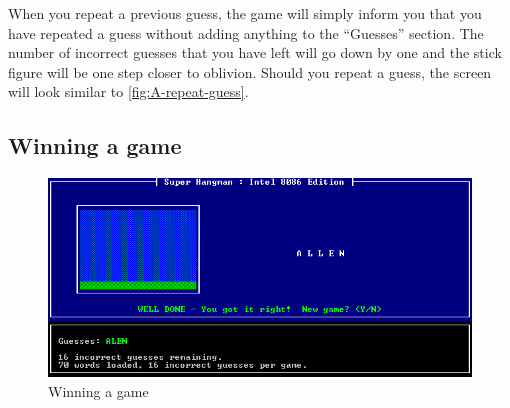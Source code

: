 When you repeat a previous guess, the game will simply inform you
that you have repeated a guess without adding anything to the ``Guesses''
section. The number of incorrect guesses that you have left will go
down by one and the stick figure will be one step closer to oblivion.
Should you repeat a guess, the screen will look similar to \ref{fig:A-repeat-guess}.


\subsection{Winning a game}

\begin{figure}[h]
\includegraphics[scale=0.5]{game_won}

\caption{\label{fig:Winning-a-game}Winning a game}


\end{figure}

